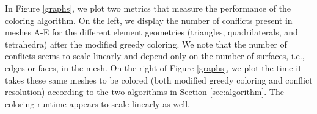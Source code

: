 \documentclass[12pt]{article}
\begin{document}
In Figure \ref{graphs}, we plot two metrics that measure the performance of the coloring algorithm.   On the left, we display the number of conflicts present in meshes A-E for the different element geometries (triangles, quadrilaterals, and tetrahedra) after the modified greedy coloring.  We note that the number of conflicts seems to scale linearly and depend only on the number of surfaces, i.e., edges or faces, in the mesh.  On the right of Figure  \ref{graphs}, we plot the time it takes these same meshes to be colored (both modified greedy coloring and conflict resolution) according to the two algorithms in Section \ref{sec:algorithm}.  The coloring runtime appears to scale linearly as well.



\begin{table}
	\centering
		
		\caption{Triangular mesh statistics; meshes A-E are on rectangular domains.  The NACA-0012 and spherical mesh A are displayed in Figure \ref{fig:meshes}.}
		\label{tab:tri}
	\end{table}
\end{document}
